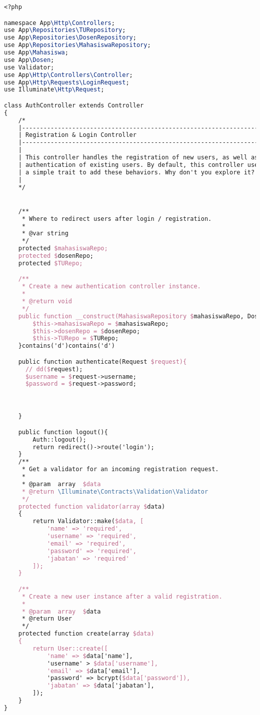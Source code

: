 \begin{lstlisting}[language=tex,basicstyle=\tiny,caption=AuthController.php]
<?php

namespace App\Http\Controllers;
use App\Repositories\TURepository;
use App\Repositories\DosenRepository;
use App\Repositories\MahasiswaRepository;
use App\Mahasiswa;
use App\Dosen;
use Validator;
use App\Http\Controllers\Controller;
use App\Http\Requests\LoginRequest;
use Illuminate\Http\Request;

class AuthController extends Controller
{
    /*
    |--------------------------------------------------------------------------
    | Registration & Login Controller
    |--------------------------------------------------------------------------
    |
    | This controller handles the registration of new users, as well as the
    | authentication of existing users. By default, this controller uses
    | a simple trait to add these behaviors. Why don't you explore it?
    |
    */


    /**
     * Where to redirect users after login / registration.
     *
     * @var string
     */
    protected $mahasiswaRepo;
    protected $dosenRepo;
    protected $TURepo;

    /**
     * Create a new authentication controller instance.
     *
     * @return void
     */
    public function __construct(MahasiswaRepository $mahasiswaRepo, DosenRepository $dosenRepo, TURepository $TURepo){
        $this->mahasiswaRepo = $mahasiswaRepo;
        $this->dosenRepo = $dosenRepo;
        $this->TURepo = $TURepo;
    }contains('d')contains('d')

    public function authenticate(Request $request){
      // dd($request);
      $username = $request->username;
      $password = $request->password;



    }

    public function logout(){
        Auth::logout();
        return redirect()->route('login');
    }
    /**
     * Get a validator for an incoming registration request.
     *
     * @param  array  $data
     * @return \Illuminate\Contracts\Validation\Validator
     */
    protected function validator(array $data)
    {
        return Validator::make($data, [
            'name' => 'required',
            'username' => 'required',
            'email' => 'required',
            'password' => 'required',
            'jabatan' => 'required'
        ]);
    }

    /**
     * Create a new user instance after a valid registration.
     *
     * @param  array  $data
     * @return User
     */
    protected function create(array $data)
    {
        return User::create([
            'name' => $data['name'],
            'username' > $data['username'],
            'email' => $data['email'],
            'password' => bcrypt($data['password']),
            'jabatan' => $data['jabatan'],
        ]);
    }
}

\end{lstlisting}